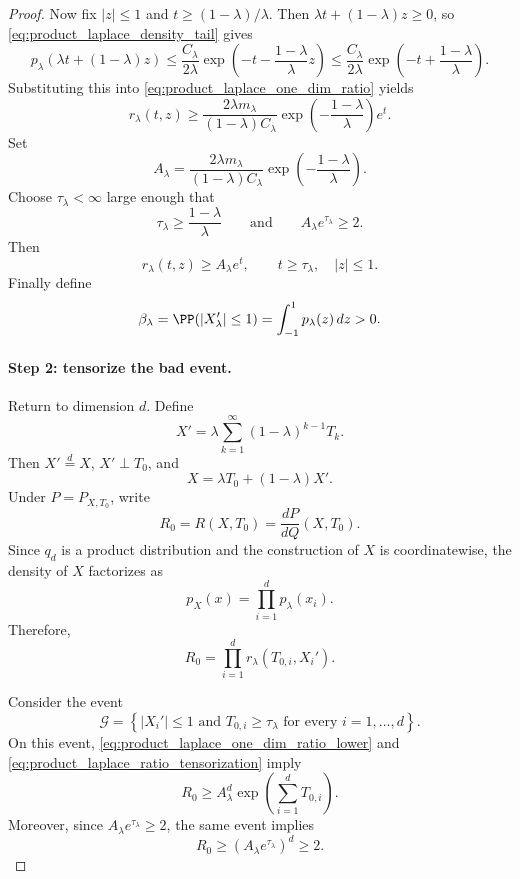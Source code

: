 \begin{proof}
    Now fix $|z|\le1$ and $t\ge(1-\lambda)/\lambda$. Then
    $\lambda t+(1-\lambda)z\ge0$, so \eqref{eq:product_laplace_density_tail} gives
    \[
        p_\lambda(\lambda t+(1-\lambda)z)
        \le
        \frac{C_\lambda}{2\lambda}
        \exp\left(
        -t-\frac{1-\lambda}{\lambda}z
        \right)
        \le
        \frac{C_\lambda}{2\lambda}
        \exp\left(
        -t+\frac{1-\lambda}{\lambda}
        \right).
    \]
    Substituting this into \eqref{eq:product_laplace_one_dim_ratio} yields
    \[
        r_\lambda(t,z)
        \ge
        \frac{2\lambda m_\lambda}{(1-\lambda)C_\lambda}
        \exp\left(-\frac{1-\lambda}{\lambda}\right)e^t .
    \]
    Set
    \[
        A_\lambda
        =
        \frac{2\lambda m_\lambda}{(1-\lambda)C_\lambda}
        \exp\left(-\frac{1-\lambda}{\lambda}\right).
    \]
    Choose $\tau_\lambda<\infty$ large enough that
    \[
        \tau_\lambda\ge\frac{1-\lambda}{\lambda}
        \qquad\text{and}\qquad
        A_\lambda e^{\tau_\lambda}\ge2.
    \]
    Then
    \[
        r_\lambda(t,z)\ge A_\lambda e^t,
        \qquad
        t\ge\tau_\lambda,\quad |z|\le1.
        \label{eq:product_laplace_one_dim_ratio_lower}
    \]
    Finally define
    \[
        \beta_\lambda
        =
        \PP(|X_\lambda'|\le1)
        =
        \int_{-1}^1 p_\lambda(z)\,dz
        >
        0.
    \]

    \paragraph{Step 2: tensorize the bad event.}
    Return to dimension $d$. Define
    \[
        X'
        =
        \lambda\sum_{k=1}^{\infty}(1-\lambda)^{k-1}T_k.
    \]
    Then $X'\stackrel{d}{=}X$, $X'\perp T_0$, and
    \[
        X=\lambda T_0+(1-\lambda)X'.
    \]
    Under $P=P_{X,T_0}$, write
    \[
        R_0=R(X,T_0)=\frac{dP}{dQ}(X,T_0).
    \]
    Since $q_d$ is a product distribution and the construction of $X$ is coordinatewise,
    the density of $X$ factorizes as
    \[
        p_X(x)=\prod_{i=1}^d p_\lambda(x_i).
    \]
    Therefore,
    \[
        R_0
        =
        \prod_{i=1}^d
        r_\lambda(T_{0,i},X_i').
        \label{eq:product_laplace_ratio_tensorization}
    \]

    Consider the event
    \[
        \mathcal G
        =
        \left\{
        |X_i'|\le1 \text{ and } T_{0,i}\ge\tau_\lambda
        \text{ for every } i=1,\ldots,d
        \right\}.
    \]
    On this event, \eqref{eq:product_laplace_one_dim_ratio_lower} and
    \eqref{eq:product_laplace_ratio_tensorization} imply
    \[
        R_0
        \ge
        A_\lambda^d
        \exp\left(\sum_{i=1}^d T_{0,i}\right).
        \label{eq:product_laplace_R0_large}
    \]
    Moreover, since $A_\lambda e^{\tau_\lambda}\ge2$, the same event implies
    \[
        R_0
        \ge
        (A_\lambda e^{\tau_\lambda})^d
        \ge2.
        \label{eq:product_laplace_R0_at_least_two}
    \]


\end{proof}
